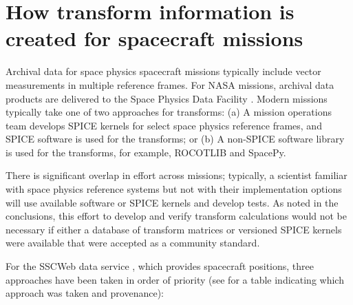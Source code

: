 \documentclass[draft]{agujournal2019}
\begin{document}
\section{How transform information is created for spacecraft missions}
\label{sect:missions}

Archival data for space physics spacecraft missions typically include vector measurements in multiple reference frames. For NASA missions, archival data products are delivered to the Space Physics Data Facility \cite{SPDF}. Modern missions typically take one of two approaches for transforms: (a) A mission operations team develops SPICE kernels for select space physics reference frames, and SPICE software is used for the transforms; or (b) A non-SPICE software library is used for the transforms, for example, ROCOTLIB and SpacePy. 

There is significant overlap in effort across missions; typically, a scientist familiar with space physics reference systems but not with their implementation options will use available software or SPICE kernels and develop tests. As noted in the conclusions, this effort to develop and verify transform calculations would not be necessary if either a database of transform matrices or versioned SPICE kernels were available that were accepted as a community standard. 

For the SSCWeb data service \cite{SSCWeb}, which provides spacecraft positions, three approaches have been taken in order of priority (see  for a table indicating which approach was taken and provenance):
\end{document}
